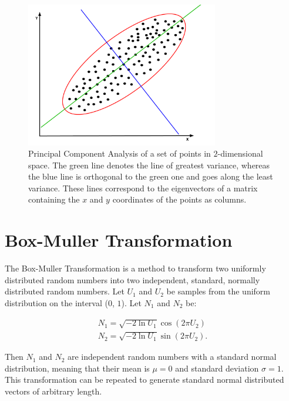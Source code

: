 \begin{figure}
  \centering
  \includegraphics[width=0.75\textwidth]{Images/PCA.pdf}
  \caption{Principal Component Analysis of a set of points in
  $2$-dimensional space. The green line denotes the line of greatest
  variance, whereas the blue line is orthogonal to the green one and
  goes along the least variance. These lines correspond to the
  eigenvectors of a matrix containing the $x$ and $y$ coordinates of the
  points as columns.}
  \label{fig:PCA}
\end{figure}

\section{Box-Muller Transformation}

The Box-Muller Transformation is a method to transform two uniformly
distributed random numbers into two independent, standard, normally
distributed random numbers. Let $U_1$ and $U_2$ be samples from the
uniform distribution on the interval ($0$, $1$). Let $N_1$ and $N_2$ be:

\begin{align}
  N_1 = \sqrt{-2 \ln{U_1}} \cos (2 \pi U_2) \\
  N_2 = \sqrt{-2 \ln{U_1}} \sin (2 \pi U_2).
\end{align}

\noindent Then $N_1$ and $N_2$ are independent random numbers with a
standard normal distribution, meaning that their mean is $\mu = 0$ and
standard deviation $\sigma = 1$. This transformation can be repeated to
generate standard normal distributed vectors of arbitrary length.

